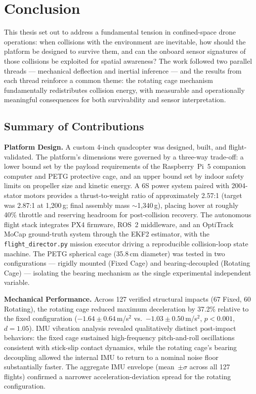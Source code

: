\clearpage
\section{Conclusion}
\label{sec:conclusion}

This thesis set out to address a fundamental tension in confined-space drone operations: when collisions with the environment are inevitable, how should the platform be designed to survive them, and can the onboard sensor signatures of those collisions be exploited for spatial awareness? The work followed two parallel threads --- mechanical deflection and inertial inference --- and the results from each thread reinforce a common theme: the rotating cage mechanism fundamentally redistributes collision energy, with measurable and operationally meaningful consequences for both survivability and sensor interpretation.

\subsection{Summary of Contributions}

\textbf{Platform Design.} A custom 4-inch quadcopter was designed, built, and flight-validated. The platform's dimensions were governed by a three-way trade-off: a lower bound set by the payload requirements of the Raspberry~Pi~5 companion computer and PETG protective cage, and an upper bound set by indoor safety limits on propeller size and kinetic energy. A 6S power system paired with 2004-stator motors provides a thrust-to-weight ratio of approximately 2.57:1 (target was 2.87:1 at 1,200\,g; final assembly mass $\sim$1,340\,g), placing hover at roughly 40\% throttle and reserving headroom for post-collision recovery. The autonomous flight stack integrates PX4 firmware, ROS~2 middleware, and an OptiTrack MoCap ground-truth system through the EKF2 estimator, with the \texttt{flight\_director.py} mission executor driving a reproducible collision-loop state machine. The PETG spherical cage (35.8\,cm diameter) was tested in two configurations --- rigidly mounted (Fixed Cage) and bearing-decoupled (Rotating Cage) --- isolating the bearing mechanism as the single experimental independent variable.

\textbf{Mechanical Performance.} Across 127 verified structural impacts (67 Fixed, 60 Rotating), the rotating cage reduced maximum deceleration by 37.2\% relative to the fixed configuration ($-1.64 \pm 0.64$\,m/s$^2$ vs.\ $-1.03 \pm 0.50$\,m/s$^2$, $p < 0.001$, $d = 1.05$). IMU vibration analysis revealed qualitatively distinct post-impact behaviors: the fixed cage sustained high-frequency pitch-and-roll oscillations consistent with stick-slip contact dynamics, while the rotating cage's bearing decoupling allowed the internal IMU to return to a nominal noise floor substantially faster. The aggregate IMU envelope (mean~$\pm\sigma$ across all 127 flights) confirmed a narrower acceleration-deviation spread for the rotating configuration.

